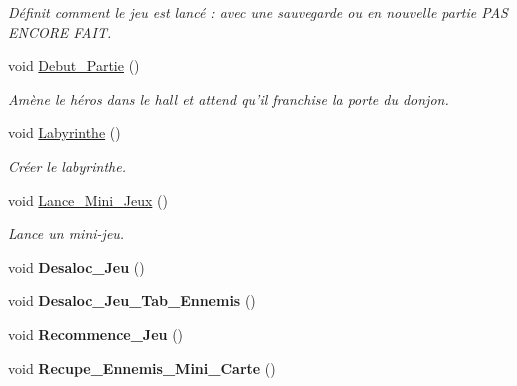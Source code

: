 \begin{DoxyCompactItemize}
\begin{DoxyCompactList}\small\item\em Définit comment le jeu est lancé \+: avec une sauvegarde ou en nouvelle partie P\+A\+S E\+N\+C\+O\+R\+E F\+A\+I\+T. \end{DoxyCompactList}\item 
\hypertarget{classJeu_ad2e3997a02c59546946aa45ddfc9fea2}{void \hyperlink{classJeu_ad2e3997a02c59546946aa45ddfc9fea2}{Debut\+\_\+\+Partie} ()}\label{classJeu_ad2e3997a02c59546946aa45ddfc9fea2}

\begin{DoxyCompactList}\small\item\em Amène le héros dans le hall et attend qu'il franchise la porte du donjon. \end{DoxyCompactList}\item 
\hypertarget{classJeu_afcb3c62eb261261aaacd2187cc83e120}{void \hyperlink{classJeu_afcb3c62eb261261aaacd2187cc83e120}{Labyrinthe} ()}\label{classJeu_afcb3c62eb261261aaacd2187cc83e120}

\begin{DoxyCompactList}\small\item\em Créer le labyrinthe. \end{DoxyCompactList}\item 
\hypertarget{classJeu_a26026d35f0a72ea75bb24ad687dfdeba}{void \hyperlink{classJeu_a26026d35f0a72ea75bb24ad687dfdeba}{Lance\+\_\+\+Mini\+\_\+\+Jeux} ()}\label{classJeu_a26026d35f0a72ea75bb24ad687dfdeba}

\begin{DoxyCompactList}\small\item\em Lance un mini-\/jeu. \end{DoxyCompactList}\item 
\hypertarget{classJeu_a6752dc9773b9bf400234de9cfe850cf9}{void {\bfseries Desaloc\+\_\+\+Jeu} ()}\label{classJeu_a6752dc9773b9bf400234de9cfe850cf9}

\item 
\hypertarget{classJeu_a9649f3bbfdfe0a505589eb322a9ed8a5}{void {\bfseries Desaloc\+\_\+\+Jeu\+\_\+\+Tab\+\_\+\+Ennemis} ()}\label{classJeu_a9649f3bbfdfe0a505589eb322a9ed8a5}

\item 
\hypertarget{classJeu_a6ae0cc96333dfbd7dd90c99829cdd45c}{void {\bfseries Recommence\+\_\+\+Jeu} ()}\label{classJeu_a6ae0cc96333dfbd7dd90c99829cdd45c}

\item 
\hypertarget{classJeu_a28c525fbd8621ae98a2ace2e81779365}{void {\bfseries Recupe\+\_\+\+Ennemis\+\_\+\+Mini\+\_\+\+Carte} ()}\label{classJeu_a28c525fbd8621ae98a2ace2e81779365}


\end{DoxyCompactItemize}
